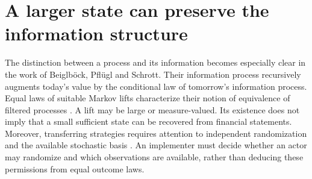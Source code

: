 

\section{A larger state can preserve the information structure}
The distinction between a process and its information becomes especially clear
in the work of Beiglb\"ock, Pfl\"ugl and Schrott. Their information process
recursively augments today's value by the conditional law of tomorrow's
information process. Equal laws of suitable Markov lifts characterize their
notion of equivalence of filtered processes
\cite[Definitions~2.6--2.8, Proposition~3.6 and Theorem~3.9]{litcloseprobview}.
A lift may be large or measure-valued. Its existence does not imply that a
small sufficient state can be recovered from financial statements. Moreover,
transferring strategies requires attention to independent randomization and
the available stochastic basis \cite[Theorem~5.4 and Remark~5.7]{litcloseprobview}.
An implementer must decide whether an actor may randomize and which observations
are available, rather than deducing these permissions from equal outcome laws.
